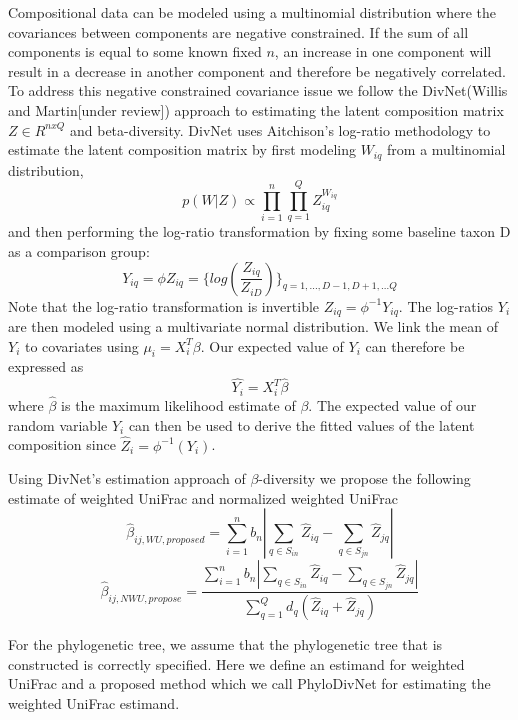 \documentclass{article}
\newcommand*{\myfont}{\fontfamily{lmtt}\selectfont}
\begin{document}
Compositional data can be modeled using a multinomial distribution where the covariances between components are negative constrained. If the sum of all components is equal to some known fixed $n$, an increase in one component will result in a decrease in another component and therefore be negatively correlated. To address this negative constrained covariance issue we follow the {\myfont DivNet}(Willis and Martin[under review]) approach to estimating the latent composition matrix $Z \in R^{nxQ}$ and beta-diversity. {\myfont DivNet} uses Aitchison’s log-ratio methodology to estimate the latent composition matrix by first modeling $W_{iq}$ from a multinomial distribution,
\begin{equation}
p(W|Z)\propto\prod_{i=1}^n \prod_{q=1}^Q Z_{iq}^{W_{iq}}
\end{equation}
and then performing the log-ratio transformation by fixing some baseline taxon D as a comparison group:
\begin{equation}
    Y_{iq}=\phi{Z_{iq}}=\{log(\frac{Z_{iq}}{Z_{iD}})\}_{q=1,...,D-1,D+1,...Q}
\end{equation}
Note that the log-ratio transformation is invertible $Z_{iq}=\phi^{-1}{Y_{iq}}$. The log-ratios $Y_{i}$ are then modeled using a multivariate normal distribution. We link the mean of $Y_i$ to covariates using $\mu_{i}=X_{i}^T\beta$. Our expected value of $Y_i$ can therefore be expressed as
\begin{equation}
    \hat{Y_i} = X_{i}^T \hat{\beta}
\end{equation}
where $\hat{\beta}$ is the maximum likelihood estimate of $\beta$. The expected value of our random variable $Y_i$ can then be used to derive the fitted values of the latent composition since $\hat{Z}_i=\phi^{-1}(Y_i)$.

Using {\myfont DivNet}'s estimation approach of $\beta$-diversity we propose the following estimate of weighted UniFrac and normalized weighted UniFrac
\begin{equation}
\hat{\beta}_{ij,WU,proposed}=\sum_{i=1}^n b_n |\sum_{q \in S_{in}} \hat{Z}_{iq} -\sum_{q \in S_{jn}} \hat{Z}_{jq}|
\end{equation}
\begin{equation}
    \hat{\beta}_{ij,NWU,propose}=\frac{\sum_{i=1}^n b_n |\sum_{q \in S_{in}} \hat{Z}_{iq}-\sum_{q \in S_{jn}} \hat{Z}_{jq}|}{\sum_{q=1}^Q d_q (\hat{Z}_{iq}+\hat{Z}_{jq})}
\end{equation}

For the phylogenetic tree, we assume that the phylogenetic tree that is constructed is correctly specified. Here we define an estimand for weighted UniFrac and a proposed method which we call {\myfont PhyloDivNet} for estimating the weighted UniFrac estimand.
\end{document}
